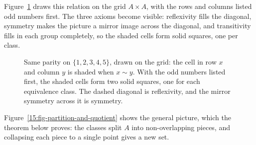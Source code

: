 Figure~\ref{15:fig-parity-grid} draws this relation on the grid $A \times A$, with the rows and columns listed odd numbers first. The three axioms become visible: reflexivity fills the diagonal, symmetry makes the picture a mirror image across the diagonal, and transitivity fills in each group completely, so the shaded cells form solid squares, one per class.

\begin{figure}[htbp]
\centering
{}
\caption{Same parity on $\{1, 2, 3, 4, 5\}$, drawn on the grid: the cell in row $x$ and column $y$ is shaded when $x \sim y$. With the odd numbers listed first, the shaded cells form two solid squares, one for each equivalence class. The dashed diagonal is reflexivity, and the mirror symmetry across it is symmetry.}
\label{15:fig-parity-grid}
\end{figure}

Figure~\ref{15:fig-partition-and-quotient} shows the general picture, which the theorem below proves: the classes split $A$ into non-overlapping pieces, and collapsing each piece to a single point gives a new set.

